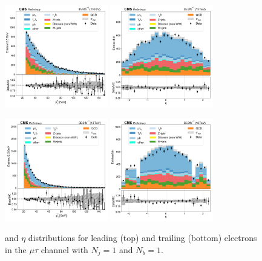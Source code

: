 \begin{figure}[htb!]
    \centering
    \includegraphics[width=0.4\textwidth]{chapters/Analysis/sectionPlots/figures/data_mc_overlays/mutau_2016_cat_eq1_eq1_signal_linear_lepton_lepton1_pt}
    \includegraphics[width=0.4\textwidth]{chapters/Analysis/sectionPlots/figures/data_mc_overlays/mutau_2016_cat_eq1_eq1_signal_linear_lepton_lepton1_eta}

    \includegraphics[width=0.4\textwidth]{chapters/Analysis/sectionPlots/figures/data_mc_overlays/mutau_2016_cat_eq1_eq1_signal_linear_lepton_lepton2_pt}
    \includegraphics[width=0.4\textwidth]{chapters/Analysis/sectionPlots/figures/data_mc_overlays/mutau_2016_cat_eq1_eq1_signal_linear_lepton_lepton2_eta}
    \caption{\pt and $\eta$ distributions for leading (top) and trailing
        (bottom) electrons in the $\mu\tau$ channel with $N_{j} = 1$ and
        $N_{b} = 1$.}
    \label{fig:analysis:plots:mutau_3_kinematic}
\end{figure}

